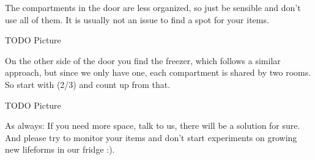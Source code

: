 The compartments in the door are less organized, so just be sensible and don't use all of them. It is usually not an issue to find a spot for your items.

{\color{darkred} TODO Picture}

On the other side of the door you find the freezer, which follows a similar approach, but since we only have one, each compartment is shared by two rooms. So start with (2/3) and count up from that.

{\color{darkred} TODO Picture}

As always: If you need more space, talk to us, there will be a solution for sure. And please try to monitor your items and don't start experiments on growing new lifeforms in our fridge :).
